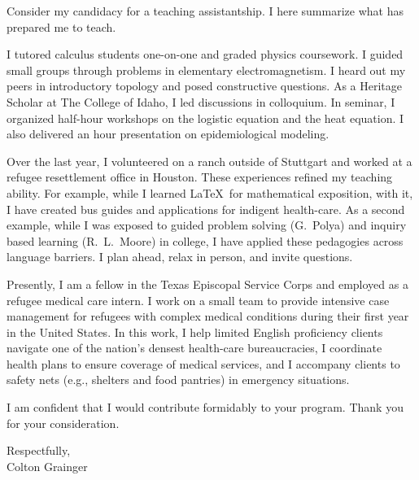 \documentclass[10pt]{letter}
\newcommand{\term}[1]{\textmd{#1}}
\begin{document}
\begin{letter}{
}
Consider my candidacy for a teaching assistantship. I here summarize what has prepared me to teach. 
\begin{description}[topsep=0pt]
	\item[Tutoring \& Grading] I \term{tutored calculus students} one-on-one and \term{graded physics coursework}. I guided small groups through problems in elementary electromagnetism. I heard out my peers in introductory topology and posed constructive questions. As a Heritage Scholar at The College of Idaho, I led discussions in colloquium. In seminar, I organized half-hour workshops on the logistic equation and the heat equation. I also delivered an hour presentation on \term{epidemiological modeling}. 
	\item[Time Away from School] Over the last year, I volunteered on a ranch outside of Stuttgart and worked at a refugee resettlement office in Houston. These experiences refined my teaching ability. For example, while I learned \LaTeX\ for mathematical exposition, with it, I have created bus guides and applications for indigent health-care. As a second example, while I was exposed to guided problem solving (G.~Polya) and inquiry based learning (R.~L.~Moore) in college, I have applied these pedagogies across language barriers. I plan ahead, relax in person, and invite questions.
\end{description}

Presently, I am a fellow in the Texas Episcopal Service Corps and employed as a refugee medical care intern. I work on a small team to provide intensive case management for refugees with complex medical conditions during their first year in the United States. In this work, I help limited English proficiency clients navigate one of the nation's densest health-care bureaucracies, I coordinate health plans to ensure coverage of medical services, and I accompany clients to safety nets (e.g., shelters and food pantries) in emergency situations.

I am confident that I would contribute formidably to your program. Thank you for your consideration.

\closing{Respectfully,\\Colton Grainger}
\end{letter}
\end{document}
